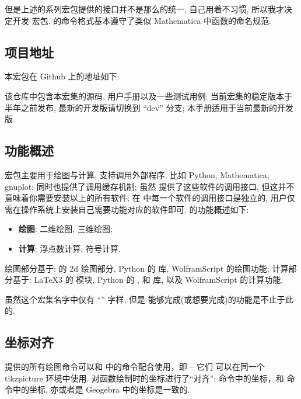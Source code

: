 \documentclass[
  hyper, lang=cn, 
  class=l3dox, 
]{../../zlatex/code/ztex}
\begin{document}
但是上述的系列宏包提供的接口并不是那么的统一, 自己用着不习惯, 所以我才决定开发  宏包. 
\zTikZ{} 的命令格式基本遵守了类似 Mathematica 中函数的命名规范.


\subsection{项目地址}
本宏包在 Github 上的地址如下:

\begin{center}
\end{center}

该仓库中包含本宏集的源码, 用户手册以及一些测试用例; 当前宏集的稳定版本于半年之前发布, 最新的开发版请切换到 ``dev'' 分支; 
本手册适用于当前最新的开发版.


\subsection{功能概述}
\zTikZ{} 宏包主要用于绘图与计算, 支持调用外部程序, 比如 Python, Mathematica, gnuplot; 同时也提供了调用缓存机制; 
虽然 \ztikz{} 提供了这些软件的调用接口, 但这并不意味着你需要安装以上的所有软件; 在 \ztikz{} 中每一个软件的调用接口是独立的, 
用户仅需在操作系统上安装自己需要功能对应的软件即可. \zTikZ{} 的功能概述如下: 
\begin{itemize}
  \item \textbf{绘图}: 二维绘图, 三维绘图;
  \item \textbf{计算}: 浮点数计算, 符号计算.
\end{itemize}

绘图部分基于: \TikZ{} 的 2d 绘图部分,%
Python 的  库, WolframScript 的绘图功能; 计算部分基于: \LaTeX3 的  模块, Python 
的 ,  和  库, 以及 WolframScript 的计算功能. 

虽然这个宏集名字中仅有 ``\TikZ{}'' 字样, 但是 \ztikz{} 能够完成(或想要完成)的功能是不止于此的.


\subsection{坐标对齐}
\zTikZ{} 提供的所有绘图命令可以和 \TikZ{} 中的命令配合使用，即 -- 它们
可以在同一个 {tikzpicture} 环境中使用. \zTikZ{} 对函数绘制时的坐标进行了``对齐'':
\zTikZ{} 命令中的坐标，和 \TikZ{} 命令中的坐标, 亦或者是 Geogebra 中的坐标是一致的. 
\end{document}
